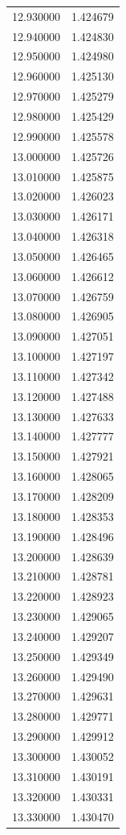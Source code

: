 \begin{tabular}{rr}
12.930000 & 1.424679 \\
12.940000 & 1.424830 \\
12.950000 & 1.424980 \\
12.960000 & 1.425130 \\
12.970000 & 1.425279 \\
12.980000 & 1.425429 \\
12.990000 & 1.425578 \\
13.000000 & 1.425726 \\
13.010000 & 1.425875 \\
13.020000 & 1.426023 \\
13.030000 & 1.426171 \\
13.040000 & 1.426318 \\
13.050000 & 1.426465 \\
13.060000 & 1.426612 \\
13.070000 & 1.426759 \\
13.080000 & 1.426905 \\
13.090000 & 1.427051 \\
13.100000 & 1.427197 \\
13.110000 & 1.427342 \\
13.120000 & 1.427488 \\
13.130000 & 1.427633 \\
13.140000 & 1.427777 \\
13.150000 & 1.427921 \\
13.160000 & 1.428065 \\
13.170000 & 1.428209 \\
13.180000 & 1.428353 \\
13.190000 & 1.428496 \\
13.200000 & 1.428639 \\
13.210000 & 1.428781 \\
13.220000 & 1.428923 \\
13.230000 & 1.429065 \\
13.240000 & 1.429207 \\
13.250000 & 1.429349 \\
13.260000 & 1.429490 \\
13.270000 & 1.429631 \\
13.280000 & 1.429771 \\
13.290000 & 1.429912 \\
13.300000 & 1.430052 \\
13.310000 & 1.430191 \\
13.320000 & 1.430331 \\
13.330000 & 1.430470 \\

\end{tabular}
